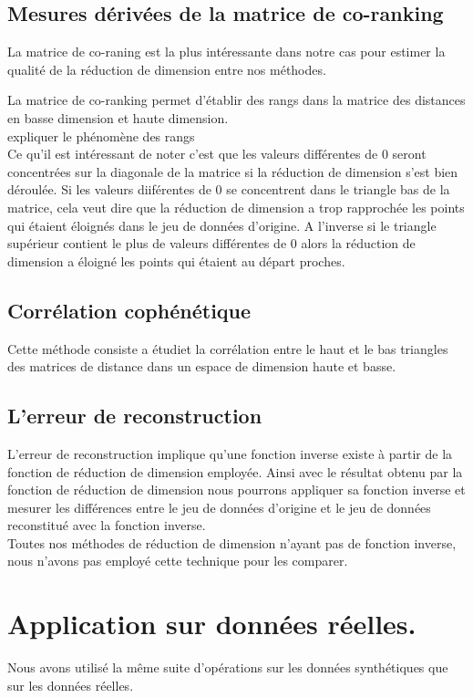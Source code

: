 \documentclass{article}
\begin{document}
\begin{multicols}{2}
\subsection{Mesures dérivées de la matrice de co-ranking}
La matrice de co-raning est la plus intéressante dans notre cas pour estimer la qualité de la réduction de dimension entre nos méthodes. 

La matrice de co-ranking permet d'établir des rangs dans la matrice des distances en basse dimension et haute dimension. \\

expliquer le phénomène des rangs \\

Ce qu'il est intéressant de noter c'est que les valeurs différentes de 0 seront concentrées sur la diagonale de la matrice si la réduction de dimension s'est bien déroulée. 
Si les valeurs diiférentes de 0 se concentrent dans le triangle bas de la matrice, cela veut dire que la réduction de dimension a trop rapprochée les points qui étaient éloignés dans le jeu de données d'origine. A l'inverse si le triangle supérieur contient le plus de valeurs différentes de 0 alors la réduction de dimension a éloigné les points qui étaient au départ proches. \\

\subsection{Corrélation cophénétique}
Cette méthode consiste a étudiet la corrélation entre le haut et le bas triangles des matrices de distance dans un espace de dimension haute et basse.\\

\subsection{L'erreur de reconstruction}
L'erreur de reconstruction implique qu'une fonction inverse existe à partir de la fonction de réduction de dimension employée. Ainsi avec le résultat obtenu par la fonction de réduction de dimension nous pourrons appliquer sa fonction inverse et mesurer les différences entre le jeu de données d'origine et le jeu de données reconstitué avec la fonction inverse. \\ 

Toutes nos méthodes de réduction de dimension n'ayant pas de fonction inverse, nous n'avons pas employé cette technique pour les comparer.\\

 


\section{Application sur données réelles. }
Nous avons utilisé la même suite d'opérations sur les données synthétiques que sur les données réelles. 
\end{multicols}
\end{document}
